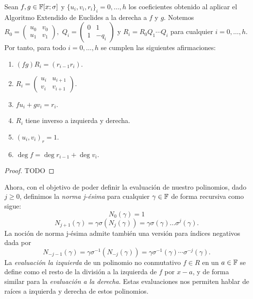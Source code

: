 \begin{lemma}
\label{lem:reea}
    Sean \(f, g \in \mathbb{F}[x; \sigma] \) y \(  {\{u_{i}, v_{i}, r_{i}\}}_i = 0, \ldots, h\) los coeficientes obtenido al aplicar el Algoritmo Extendido de Euclides a la derecha a \(f\) y \(g\). Notemos \(R_{0} =
    \begin{pmatrix}
    u_0 & v_0 \\
    u_1 & v_1
    \end{pmatrix},\)
    \(Q_i =
    \begin{pmatrix}
        0 & 1 \\
        1 & -q_i
    \end{pmatrix}
    \)
    y \(R_i =  R_0 Q_1 \cdots Q_i\) para cualquier \(i = 0, \ldots, h\). Por tanto, para todo \(i = 0, \ldots, h\) se cumplen las siguientes afirmaciones:

    \begin{enumerate}[label=\roman*)]
        \item \((fg)R_i = (r_{i-1} r_i)\).
        \item \(R_i =
            \begin{pmatrix}
            u_i & u_{i+1} \\
            v_{i} & v_{i+1}
            \end{pmatrix}\).
        \item \(f u_i + g v_i = r_i\).
        \item \(R_i\) tiene inverso a izquierda y derecha.
        \item \((u_i, v_i)_r = 1\).
        \item \(\deg f = \deg r_{i-1} + \deg v_{i}\).

    \end{enumerate}
\end{lemma}
\begin{proof}
    TODO
\end{proof}

Ahora, con el objetivo de poder definir la evaluación de nuestro polinomios, dado \(j \geq 0\), definimos la \textit{norma j-ésima} para cualquier \(\gamma \in \mathbb{F}\) de forma recursiva como sigue:
\[
N_0(\gamma) = 1
\]
\[
N_{j+1}(\gamma) = \gamma \sigma(N_{j}(\gamma)) = \gamma \sigma(\gamma)\dots\sigma^{j}(\gamma)
.\]
La noción de norma j-ésima admite también una versión para índices negativos dada por
\[
N_{-j-1}(\gamma) = \gamma \sigma^{-1}(N_{-j}(\gamma)) =  \gamma \sigma^{-1}(\gamma) \cdots \sigma^{-j}(\gamma)
.\]
La \textit{evaluación la izquierda} de un polinomio no conmutativo \(f \in R\) en un \(a \in \mathbb{F}\) se define como el resto de la división a la izquierda de \(f\) por  \(x - a\), y de forma similar para la  \textit{evaluación a la derecha}. Estas evaluaciones nos permiten hablar de raíces a izquierda y derecha de estos polinomios.

